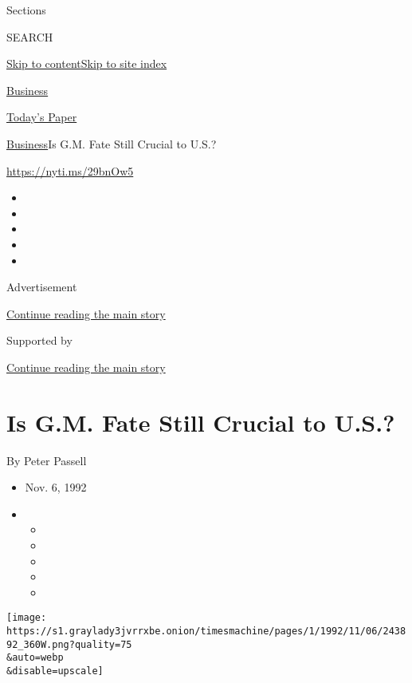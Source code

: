 Sections

SEARCH

\protect\hyperlink{site-content}{Skip to
content}\protect\hyperlink{site-index}{Skip to site index}

\href{https://www.nytimes3xbfgragh.onion/section/business}{Business}

\href{https://myaccount.nytimes3xbfgragh.onion/auth/login?response_type=cookie\&client_id=vi}{}

\href{https://www.nytimes3xbfgragh.onion/section/todayspaper}{Today's
Paper}

\href{/section/business}{Business}\textbar{}Is G.M. Fate Still Crucial
to U.S.?

\url{https://nyti.ms/29bnOw5}

\begin{itemize}
\item
\item
\item
\item
\item
\end{itemize}

Advertisement

\protect\hyperlink{after-top}{Continue reading the main story}

Supported by

\protect\hyperlink{after-sponsor}{Continue reading the main story}

\hypertarget{is-gm-fate-still-crucial-to-us}{%
\section{Is G.M. Fate Still Crucial to
U.S.?}\label{is-gm-fate-still-crucial-to-us}}

By Peter Passell

\begin{itemize}
\item
  Nov. 6, 1992
\item
  \begin{itemize}
  \item
  \item
  \item
  \item
  \item
  \end{itemize}
\end{itemize}

\texttt{[image: https://s1.graylady3jvrrxbe.onion/timesmachine/pages/1/1992/11/06/243892\_360W.png?quality=75\\\&auto=webp\\\&disable=upscale]}

